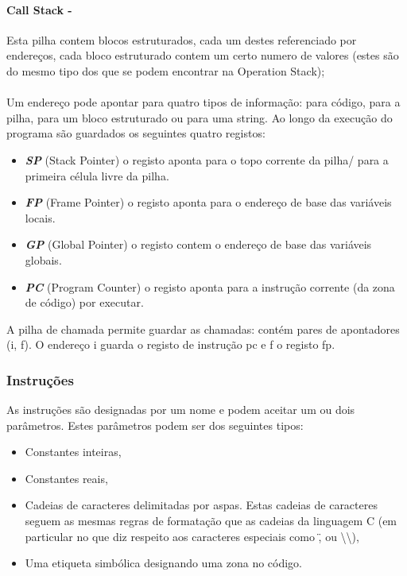 \documentclass{report}
\begin{document}
\paragraph{\quad Call Stack -}
Esta pilha contem blocos estruturados, cada um destes referenciado por endereços, cada bloco
estruturado contem um certo numero de valores (estes são do mesmo tipo dos que se podem encontrar na Operation Stack);
\\
\\
\null\quad Um endereço pode apontar para quatro tipos de informação: para código, para a
pilha, para um bloco estruturado ou para uma string.
Ao longo da execução do programa são guardados os seguintes quatro registos:
\begin{itemize}
	\item \textit{\textbf{SP}} (Stack Pointer) o registo aponta para o topo corrente da pilha/ para a primeira célula livre da pilha.
	\item \textit{\textbf{FP}} (Frame Pointer) o registo aponta para o endereço de base das variáveis locais.
	\item \textit{\textbf{GP}} (Global Pointer) o registo contem o endereço de base das variáveis globais.
	\item \textit{\textbf{PC}} (Program Counter) o registo aponta para a instrução corrente (da zona de código) por executar.
\end{itemize}

A pilha de chamada permite guardar as chamadas: contém pares de apontadores
(i, f). O endereço i guarda o registo de instrução pc e f o registo fp.

\subsubsection{Instruções}

\quad As instruções são designadas por um nome e podem aceitar um ou dois parâmetros.
Estes parâmetros podem ser dos seguintes tipos:
\begin{itemize}
\item Constantes inteiras,
\item Constantes reais,
\item Cadeias de caracteres delimitadas por aspas. Estas cadeias de caracteres seguem as
mesmas regras de formatação que as cadeias da linguagem C (em particular no que
diz respeito aos caracteres especiais como \", \n ou \textbackslash\textbackslash ),
\item Uma etiqueta simbólica designando uma zona no código.
\end{itemize}
\end{document}
